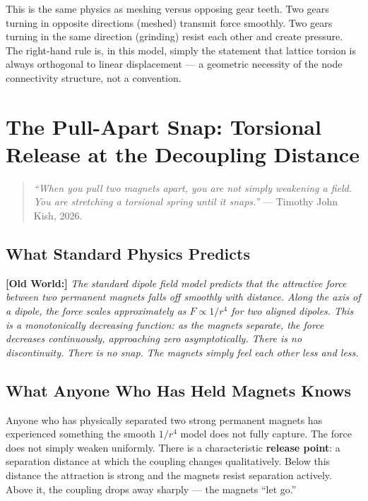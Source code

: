\documentclass[11pt, letterpaper, openany]{book}
\newcommand{\oldworld}[1]{\noindent\textbf{\color{goldseal}[Old World:]}
  \textit{#1}\medskip}
\begin{document}
This is the same physics as meshing versus opposing gear teeth. Two gears
turning in opposite directions (meshed) transmit force smoothly. Two gears
turning in the same direction (grinding) resist each other and create pressure.
The right-hand rule is, in this model, simply the statement that lattice
torsion is always orthogonal to linear displacement — a geometric necessity
of the node connectivity structure, not a convention.

\clearpage

\chapter{The Pull-Apart Snap: Torsional Release at the Decoupling Distance}

\begin{quote}
\textit{``When you pull two magnets apart, you are not simply weakening a field.
You are stretching a torsional spring until it snaps.''} --- Timothy John Kish, 2026.
\end{quote}

\section{What Standard Physics Predicts}

\oldworld{The standard dipole field model predicts that the attractive
force between two permanent magnets falls off smoothly with distance.
Along the axis of a dipole, the force scales approximately as
$F \propto 1/r^4$ for two aligned dipoles. This is a monotonically
decreasing function: as the magnets separate, the force decreases
continuously, approaching zero asymptotically. There is no discontinuity.
There is no snap. The magnets simply feel each other less and less.}

\section{What Anyone Who Has Held Magnets Knows}

Anyone who has physically separated two strong permanent magnets has
experienced something the smooth $1/r^4$ model does not fully capture.
The force does not simply weaken uniformly. There is a characteristic
\textbf{release point}: a separation distance at which the coupling
changes qualitatively. Below this distance the attraction is strong and
the magnets resist separation actively. Above it, the coupling drops away
sharply — the magnets ``let go.''
\end{document}
